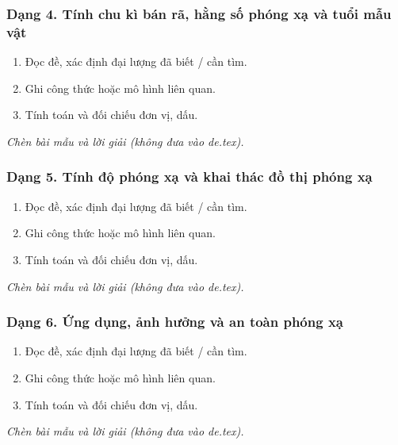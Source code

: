 \subsubsection{Dạng 4. Tính chu kì bán rã, hằng số phóng xạ và tuổi mẫu vật}
\begin{phuongphap}
\begin{enumerate}
\item Đọc đề, xác định đại lượng đã biết / cần tìm.
\item Ghi công thức hoặc mô hình liên quan.
\item Tính toán và đối chiếu đơn vị, dấu.
\end{enumerate}
\end{phuongphap}
\begin{vidumau}
\textit{Chèn bài mẫu và lời giải (không đưa vào de.tex).}
\end{vidumau}

\subsubsection{Dạng 5. Tính độ phóng xạ và khai thác đồ thị phóng xạ}
\begin{phuongphap}
\begin{enumerate}
\item Đọc đề, xác định đại lượng đã biết / cần tìm.
\item Ghi công thức hoặc mô hình liên quan.
\item Tính toán và đối chiếu đơn vị, dấu.
\end{enumerate}
\end{phuongphap}
\begin{vidumau}
\textit{Chèn bài mẫu và lời giải (không đưa vào de.tex).}
\end{vidumau}

\subsubsection{Dạng 6. Ứng dụng, ảnh hưởng và an toàn phóng xạ}
\begin{phuongphap}
\begin{enumerate}
\item Đọc đề, xác định đại lượng đã biết / cần tìm.
\item Ghi công thức hoặc mô hình liên quan.
\item Tính toán và đối chiếu đơn vị, dấu.
\end{enumerate}
\end{phuongphap}
\begin{vidumau}
\textit{Chèn bài mẫu và lời giải (không đưa vào de.tex).}
\end{vidumau}

